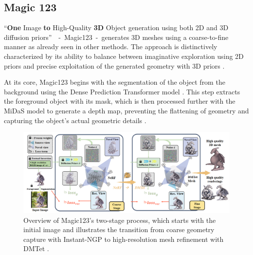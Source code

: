 \subsection{Magic 123}\label{Magic123}

``\textbf{One} Image \textbf{to} High-Quality \textbf{3D} Object generation using both 2D and 3D diffusion priors''~\citep{qian2023magic123}~-~Magic123~-~generates 3D meshes using a coarse-to-fine manner as already seen in other methods. The approach is distinctively characterized by its ability to balance between imaginative exploration  using 2D priors and precise exploitation of the generated geometry with 3D priors \citep{qian2023magic123}.

At its core, Magic123 begins with the segmentation of the object from the background using the Dense Prediction Transformer model \citep{ranftl2021vision}. This step extracts the foreground object with its mask, which is then processed further with the MiDaS \citep{ranftl2020robust} model to generate a depth map, preventing the flattening of geometry and capturing the object's actual geometric details \citep{qian2023magic123}.

\begin{figure}[ht]
  \centering
    \includegraphics[width=1\columnwidth]{figures/Magic123.png}
    \caption{Overview of Magic123's two-stage process, which starts with the initial image and illustrates the transition from coarse geometry capture with Instant-NGP to high-resolution mesh refinement with DMTet \citep{qian2023magic123}.}\label{fig:figureMagic123}
\end{figure}


